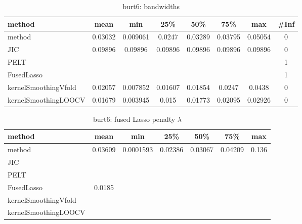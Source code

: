 \begin{table}[ht]
\centering
\begin{tabular}{l|c|ccccc|c}
  \hline
method & mean & min & 25\% & 50\% & 75\% & max & \#Inf \\ 
  \hline
method & 0.03032 & 0.009061 & 0.0247 & 0.03289 & 0.03795 & 0.05054 &   0 \\ 
  JIC & 0.09896 & 0.09896 & 0.09896 & 0.09896 & 0.09896 & 0.09896 &   0 \\ 
  PELT &  &  &  &  &  &  &   1 \\ 
  FusedLasso &  &  &  &  &  &  &   1 \\ 
  kernelSmoothingVfold & 0.02057 & 0.007852 & 0.01607 & 0.01854 & 0.0247 & 0.0438 &   0 \\ 
  kernelSmoothingLOOCV & 0.01679 & 0.003945 & 0.015 & 0.01773 & 0.02095 & 0.02926 &   0 \\ 
   \hline
\end{tabular}
\caption{burt6: bandwidths} 
\label{tab:burt6Bandwidths}
\end{table}
\begin{table}[ht]
\centering
\begin{tabular}{l|c|ccccc}
  \hline
method & mean & min & 25\% & 50\% & 75\% & max \\ 
  \hline
method & 0.03609 & 0.0001593 & 0.02386 & 0.03067 & 0.04209 & 0.136 \\ 
  JIC &  &  &  &  &  &  \\ 
  PELT &  &  &  &  &  &  \\ 
  FusedLasso & 0.0185 &  &  &  &  &  \\ 
  kernelSmoothingVfold &  &  &  &  &  &  \\ 
  kernelSmoothingLOOCV &  &  &  &  &  &  \\ 
   \hline
\end{tabular}
\caption{burt6: fused Lasso penalty $\lambda$} 
\label{tab:burt6Lambdas}
\end{table}
